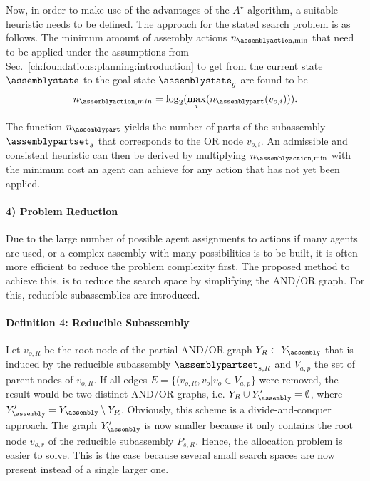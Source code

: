 Now, in order to make use of the advantages of the $A^\star$ algorithm, a suitable heuristic needs to be defined.
The approach for the stated search problem is as follows.
The minimum amount of assembly actions $n_{\assemblyaction,\text{min}}$ that need to be applied under the assumptions from Sec.~\ref{ch:foundations:planning:introduction} to get from the current state $\assemblystate$ to the goal state $\assemblystate_g$ are found to be
\begin{equation*}
n_{\assemblyaction,min}=\log_2(\max_i (n_\assemblypart(v_{o,i}))).
\end{equation*}

The function $n_\assemblypart$ yields the number of parts of the subassembly $\assemblypartset_s$ that corresponds to the OR node $v_{o,i}$.
An admissible and consistent heuristic can then be derived by multiplying $n_{\assemblyaction,\text{min}}$ with the minimum cost an agent can achieve for any action that has not yet been applied.

\paragraph{4) Problem Reduction}

Due to the large number of possible agent assignments to actions if many agents are used, or a complex assembly with many possibilities is to be built, it is often more efficient to reduce the problem complexity first.
The proposed method to achieve this, is to reduce the search space by simplifying the AND/OR graph.
For this, reducible subassemblies are introduced.


\paragraph{Definition 4: Reducible Subassembly}

Let $v_{o,R}$ be the root node of the partial AND/OR graph $Y_R \subset Y_\assembly$ that is induced by the reducible subassembly $\assemblypartset_{s,R}$ and $V_{a,p}$ the set of parent nodes of $v_{o,R}$.
If all edges $E=\{{(v_{o,R},v_o}|v_o \in V_{a,p}\}$ were removed, the result would be two distinct AND/OR graphs, i.e. $Y_R \cup Y^\prime_\assembly=\emptyset$, where $Y^\prime_\assembly=Y_\assembly \setminus Y_R$.
Obviously, this scheme is a divide-and-conquer approach.
The graph $Y^\prime_\assembly$ is now smaller because it only contains the root node $v_{o,r}$ of the reducible subassembly $P_{s,R}$.
Hence, the allocation problem is easier to solve.
This is the case because several small search spaces are now present instead of a single larger one.

